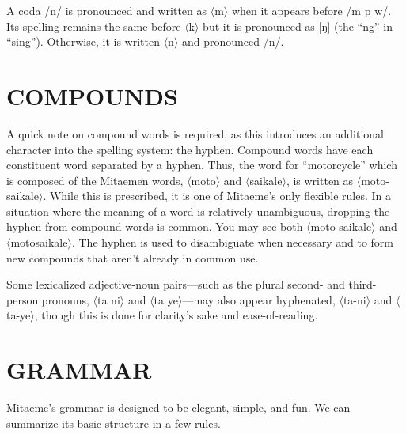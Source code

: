 \documentclass[a4paper]{article}
\begin{document}
A coda /n/ is pronounced and written as $\langle$m$\rangle$ when it appears before /m p w/. Its spelling remains the same before $\langle$k$\rangle$ but it is pronounced as [ŋ] (the ``ng'' in ``sing''). Otherwise, it is written $\langle$n$\rangle$ and pronounced /n/.

\section{COMPOUNDS}

A quick note on compound words is required, as this introduces an additional character into the spelling system: the hyphen. Compound words have each constituent word separated by a hyphen. Thus, the word for ``motorcycle'' which is composed of the Mitaemen words, $\langle$moto$\rangle$  and $\langle$saikale$\rangle$, is written as $\langle$moto-saikale$\rangle$. While this is prescribed, it is one of Mitaeme's only flexible rules. In a situation where the meaning of a word is relatively unambiguous, dropping the hyphen from compound words is common. You may see both $\langle$moto-saikale$\rangle$ and $\langle$motosaikale$\rangle$. The hyphen is used to disambiguate when necessary and to form new compounds that aren't already in common use.

Some lexicalized adjective-noun pairs—such as the plural second- and third-person pronouns, $\langle$ta ni$\rangle$ and $\langle$ta ye$\rangle$—may also appear hyphenated,  $\langle$ta-ni$\rangle$ and $\langle$ta-ye$\rangle$, though this is done for clarity's sake and ease-of-reading.

\section{GRAMMAR}

Mitaeme's grammar is designed to be elegant,  simple, and fun. We can summarize its basic structure in a few rules.
\end{document}
